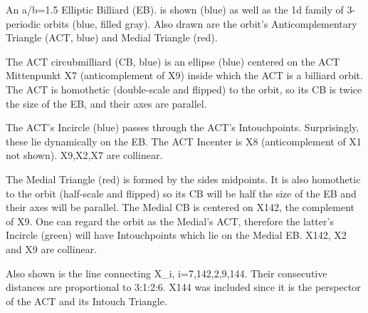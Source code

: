 An a/b=1.5 Elliptic Billiard (EB). is shown (blue) as well as the 1d family of 3-periodic orbits (blue, filled gray). Also drawn are the orbit's Anticomplementary Triangle (ACT, blue) and Medial Triangle (red).

The ACT circubmilliard (CB, blue) is an ellipse (blue) centered on the ACT Mittenpunkt X7 (anticomplement of X9) inside which the ACT is a billiard orbit. The ACT is homothetic (double-scale and flipped) to the orbit, so its CB is twice the size of the EB, and their axes are parallel.

The ACT's Incircle (blue) passes through the ACT's Intouchpoints. Surprisingly, these lie dynamically on the EB. The ACT Incenter is X8 (anticomplement of X1 not shown). X9,X2,X7 are collinear.

The Medial Triangle (red) is formed by the sides midpoints. It is also homothetic to the orbit (half-scale and flipped) so its CB will be half the size of the EB and their axes will be parallel. The Medial CB is centered on X142, the complement of X9. One can regard the orbit as the Medial's ACT, therefore the latter's Incircle (green) will have Intouchpoints which lie on the Medial EB. X142, X2 and X9 are collinear.

Also shown is the line connecting X_i, i=7,142,2,9,144. Their consecutive distances are proportional to 3:1:2:6. X144 was included since it is the perspector of the ACT and its Intouch Triangle.
